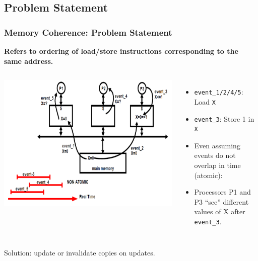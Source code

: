 \documentclass{beamer}
\renewcommand{\emph}[1]{\textcolor{structure}{#1}}
\begin{document}
\subsection{Problem Statement}

\begin{frame}[fragile]
	\tableofcontents[currentsection]
\end{frame}

\begin{frame}[fragile,t]
\frametitle{Memory Coherence: Problem Statement}

{\bf Refers to ordering of load/store instructions corresponding
to the same address.}

\begin{columns}
\includegraphics[width=50ex]{Ch7Figs/ProblemMemCoh}\pause
{}
\begin{itemize}
    \item {\tt event\_1/2/4/5}: Load {\tt X}
    \item {\tt event\_3}: Store 1 in {\tt X}
    \item Even assuming events do not overlap in time (atomic):
    \item Processors P1 and P3 ``see'' different values of X after {\tt event\_3}.  
\end{itemize}
\end{columns}

\emph{Solution: update or invalidate copies on updates. }

\end{frame}
\end{document}
